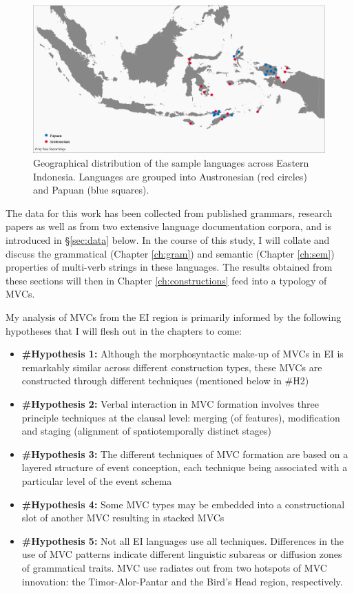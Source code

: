 \begin{figure}
\includegraphics[width=\columnwidth]{figures/Map_overview_klein.eps}
\caption[Geographical distribution of sample languages]{Geographical distribution of the sample languages across Eastern Indonesia. Languages are grouped into Austronesian (red circles) and Papuan (blue squares).}\label{map:overview}
\end{figure}

The data for this work has been collected from published grammars, research papers as well as from two extensive language documentation corpora, and is introduced in §\ref{sec:data} below. In the course of this study, I will collate and discuss the grammatical (Chapter \ref{ch:gram}) and semantic (Chapter \ref{ch:sem}) properties of multi-verb strings in these languages. The results obtained from these sections will then in Chapter \ref{ch:constructions} feed into a typology of MVCs. 

My analysis of MVCs from the EI region is primarily informed by the following hypotheses that I will flesh out in the chapters to come:

\begin{footnotesize}
\begin{itemize}
\item \textbf{\#Hypothesis 1:} Although the morphosyntactic make-up of MVCs in EI is remarkably similar across different construction types, these MVCs are constructed through different techniques (mentioned below in \#H2)
\item \textbf{\#Hypothesis 2:} Verbal interaction in MVC formation involves three principle techniques at the clausal level: merging (of features), modification and staging (alignment of spatiotemporally distinct stages)
\item \textbf{\#Hypothesis 3:} The different techniques of MVC formation are based on a layered structure of event conception, each technique being associated with a particular level of the event schema
\item \textbf{\#Hypothesis 4:} Some MVC types may be embedded into a constructional slot of another MVC resulting in stacked MVCs
\item \textbf{\#Hypothesis 5:} Not all EI languages use all techniques. Differences in the use of MVC patterns indicate different linguistic subareas or diffusion zones of grammatical traits. MVC use radiates out from two hotspots of MVC innovation: the Timor-Alor-Pantar and the Bird's Head region, respectively.
\end{itemize}
\end{footnotesize}


